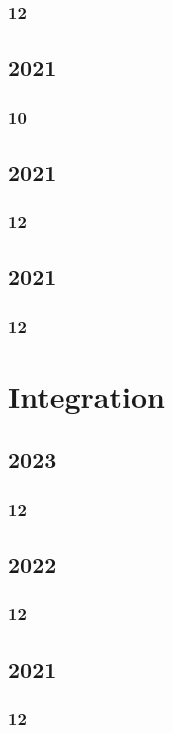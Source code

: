 \documentclass[11pt]{book}
\begin{document}
\subsection{12}

\section{2021}
\subsection{10}

\section{2021}
\subsection{12}

\section{2021}
\subsection{12}



\chapter{Integration}
\section{2023}
\subsection{12}

\section{2022}
\subsection{12}


\section{2021}
\subsection{12}

\end{document}
